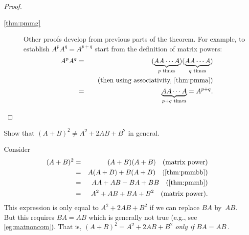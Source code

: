 \begin{proof}
\begin{description}
\item[\ref{thm:pmmg}]
Other proofs develop from previous parts of the theorem.
For example, to establish \(A^pA^q=A^{p+q}\) start from the definition of matrix powers:
\begin{eqnarray*}
A^pA^q&=&(\underbrace{AA\cdots A}_{p\text{ times}})
(\underbrace{AA\cdots A}_{q\text{ times}})
\\&&\quad(\text{then using associativity, \cref{thm:pmma}})
\\&=&\underbrace{AA\cdots A}_{p+q\text{ times}}
=A^{p+q}.
\end{eqnarray*}

\end{description}
\end{proof}



\begin{example} 
Show that \((A+B)^2\neq A^2+2AB+B^2\)  in general.
\begin{solution} 
Consider
\begin{eqnarray*}
(A+B)^2&=& (A+B)(A+B) \quad(\text{matrix power})
\\&=&A(A+B)+B(A+B) \quad(\text{\cref{thm:pmmbb}})
\\&=&AA+AB+BA+BB \quad(\text{\cref{thm:pmmb}})
\\&=&A^2+AB+BA+B^2 \quad(\text{matrix power}).
\end{eqnarray*}
This expression is only equal to \(A^2+2AB+B^2\) if we can replace \(BA\) by~\(AB\).  
But this requires \(BA=AB\) which is generally not true (e.g., see \cref{eg:matnoncom}).
That is, \((A+B)^2= A^2+2AB+B^2\) \emph{only if} \(BA=AB\)\,.
\end{solution}
\end{example}





